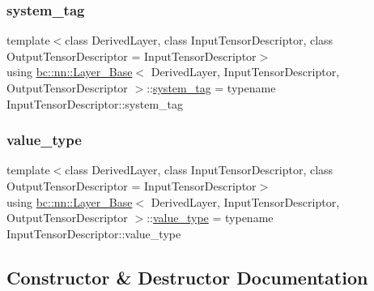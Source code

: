 \mbox{\label{structbc_1_1nn_1_1Layer__Base_a17374088839df88dbc0c4b16fb678711}} 
\subsubsection{\texorpdfstring{system\+\_\+tag}{system\_tag}}
{\footnotesize\ttfamily template$<$class Derived\+Layer, class Input\+Tensor\+Descriptor, class Output\+Tensor\+Descriptor = Input\+Tensor\+Descriptor$>$ \\
using \hyperlink{structbc_1_1nn_1_1Layer__Base}{bc\+::nn\+::\+Layer\+\_\+\+Base}$<$ Derived\+Layer, Input\+Tensor\+Descriptor, Output\+Tensor\+Descriptor $>$\+::\hyperlink{structbc_1_1nn_1_1Layer__Base_a17374088839df88dbc0c4b16fb678711}{system\+\_\+tag} =  typename Input\+Tensor\+Descriptor\+::system\+\_\+tag}

\mbox{\label{structbc_1_1nn_1_1Layer__Base_a64df0ea9c50a4d6dcf59483cc797c393}} 
\subsubsection{\texorpdfstring{value\+\_\+type}{value\_type}}
{\footnotesize\ttfamily template$<$class Derived\+Layer, class Input\+Tensor\+Descriptor, class Output\+Tensor\+Descriptor = Input\+Tensor\+Descriptor$>$ \\
using \hyperlink{structbc_1_1nn_1_1Layer__Base}{bc\+::nn\+::\+Layer\+\_\+\+Base}$<$ Derived\+Layer, Input\+Tensor\+Descriptor, Output\+Tensor\+Descriptor $>$\+::\hyperlink{structbc_1_1nn_1_1Layer__Base_a64df0ea9c50a4d6dcf59483cc797c393}{value\+\_\+type} =  typename Input\+Tensor\+Descriptor\+::value\+\_\+type}



\subsection{Constructor \& Destructor Documentation}
\mbox{\label{structbc_1_1nn_1_1Layer__Base_a7f39c80e492c9b0bd4bc5ebbeb629599}} 
